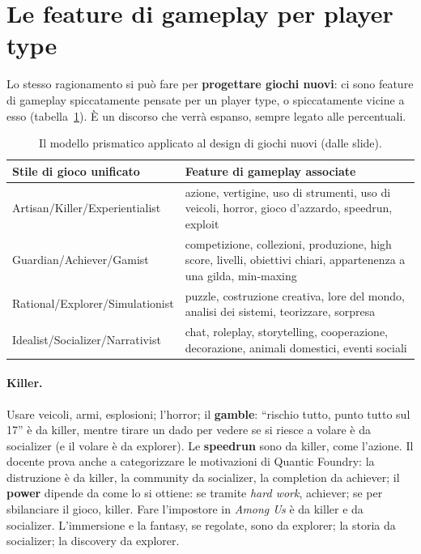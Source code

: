 \section{Le feature di gameplay per player type}
\label{gd18:sec:feature}

Lo stesso ragionamento si può fare per \textbf{progettare giochi nuovi}: ci sono
feature di gameplay spiccatamente pensate per un player type, o spiccatamente vicine
a esso (tabella~\ref{gd18:tab:feature}). È un discorso che verrà espanso, sempre
legato alle percentuali.

\begin{table}[ht]
\centering
\small
\begin{tabular}{@{}p{}p{}@{}}
\toprule
\textbf{Stile di gioco unificato} & \textbf{Feature di gameplay associate} \\
\midrule
Artisan/Killer/Experientialist & azione, vertigine, uso di strumenti, uso di
veicoli, horror, gioco d'azzardo, speedrun, exploit \\
Guardian/Achiever/Gamist & competizione, collezioni, produzione, high score,
livelli, obiettivi chiari, appartenenza a una gilda, min-maxing \\
Rational/Explorer/Simulationist & puzzle, costruzione creativa, lore del mondo,
analisi dei sistemi, teorizzare, sorpresa \\
Idealist/Socializer/Narrativist & chat, roleplay, storytelling, cooperazione,
decorazione, animali domestici, eventi sociali \\
\bottomrule
\end{tabular}
\caption{Il modello prismatico applicato al design di giochi nuovi (dalle slide).}
\label{gd18:tab:feature}
\end{table}

\paragraph{Killer.} Usare veicoli, armi, esplosioni; l'horror; il \textbf{gamble}:
``rischio tutto, punto tutto sul 17'' è da killer, mentre tirare un dado per vedere
se si riesce a volare è da socializer (e il volare è da explorer). Le
\textbf{speedrun} sono da killer, come l'azione. Il docente prova anche a
categorizzare le motivazioni di Quantic Foundry: la distruzione è da killer, la
community da socializer, la completion da achiever; il \textbf{power} dipende da
come lo si ottiene: se tramite \emph{hard work}, achiever; se per sbilanciare il
gioco, killer. Fare l'impostore in \emph{Among Us} è da killer e da socializer.
L'immersione e la fantasy, se regolate, sono da explorer; la storia da socializer;
la discovery da explorer.

